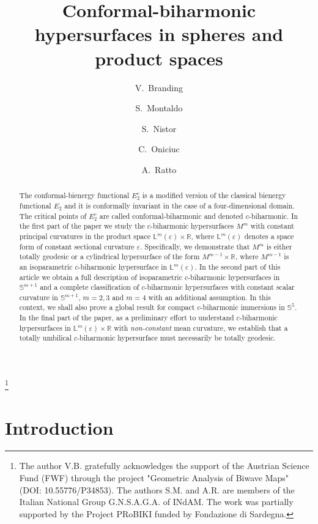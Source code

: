 \documentclass[11pt,leqno]{amsart}
\title[Conformal-biharmonic hypersurfaces]{
 Conformal-biharmonic hypersurfaces in spheres and product spaces}
\author{V.~Branding}
\author{S.~Montaldo}
\author{S.~Nistor}
\author{C.~Oniciuc}
\author{A.~Ratto}
\theoremstyle{plain}
\theoremstyle{definition}
\numberwithin{equation}{section}
\def \s{{\mathbb S}}
\numberwithin{equation}{section}
\begin{document}
\begin{abstract}

The conformal-bienergy functional $E_2^c$ is a modified version of the classical bienergy functional $E_2$ and it is conformally invariant in the case of a four-dimensional domain. 
The critical points of $E_2^c$ are called conformal-biharmonic and denoted $c$-biharmonic. In the first part of the paper we study the $c$-biharmonic hypersurfaces $M^m$ with constant principal curvatures in the product space $ {\mathbb L}^m(\varepsilon) \times \mathbb{R} $, where $ {\mathbb L}^m(\varepsilon) $ denotes a space form of constant sectional curvature $ \varepsilon $. Specifically, we demonstrate that $ M^m $ is either totally geodesic or a cylindrical hypersurface of the form $ M^{m-1} \times \mathbb{R} $, where $ M^{m-1} $ is an iso\-parametric $c$-biharmonic hypersurface in $ {\mathbb L}^m(\varepsilon) $. In the second part of this article we obtain a full description of isoparametric $c$-biharmonic hypersurfaces in $\s^{m+1}$ and a complete classification of $c$-biharmonic hypersurfaces with constant scalar curvature in $\s^{m+1}$, $m=2,3$ and $m=4$ with an additional assumption. In this context, we shall also prove a global result for compact $c$-biharmonic immersions in $\s^5$. In the final part of the paper, as a preliminary effort to understand $c$-biharmonic hypersurfaces in $ {\mathbb L}^m(\varepsilon) \times \mathbb{R} $ with \textit{non-constant} mean curvature, we establish that a totally umbilical  $c$-biharmonic hypersurface must necessarily be totally geodesic.
\end{abstract}

%


\thanks{The author V.B. gratefully acknowledges the support of the Austrian Science Fund (FWF)
through the project "Geometric Analysis of Biwave Maps" (DOI: 10.55776/P34853). The authors S.M. and A.R. are members of the Italian National Group G.N.S.A.G.A. of INdAM. The work was partially supported by the Project {PRoBIKI} funded by Fondazione di Sardegna.}

\maketitle
\section{Introduction}
\end{document}
